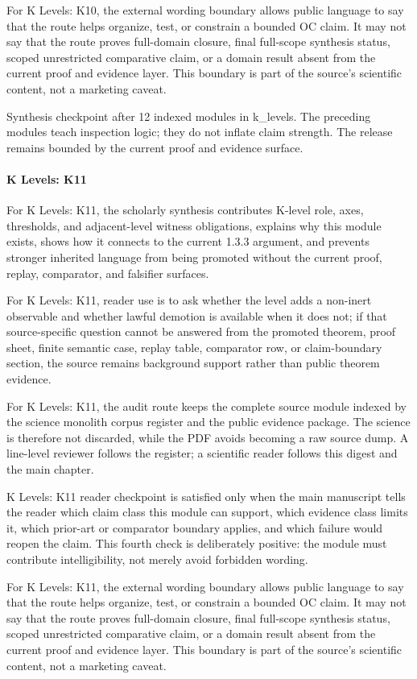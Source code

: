 For K Levels: K10, the external wording boundary allows public language to say that the route helps organize, test, or constrain a bounded OC claim. It may not say that the route proves full-domain closure, final full-scope synthesis status, scoped unrestricted comparative claim, or a domain result absent from the current proof and evidence layer. This boundary is part of the source's scientific content, not a marketing caveat.


Synthesis checkpoint after 12 indexed modules in k\_levels. The preceding modules teach inspection logic; they do not inflate claim strength. The release remains bounded by the current proof and evidence surface.


\paragraph{K Levels: K11}

For K Levels: K11, the scholarly synthesis contributes K-level role, axes, thresholds, and adjacent-level witness obligations, explains why this module exists, shows how it connects to the current 1.3.3 argument, and prevents stronger inherited language from being promoted without the current proof, replay, comparator, and falsifier surfaces.


For K Levels: K11, reader use is to ask whether the level adds a non-inert observable and whether lawful demotion is available when it does not; if that source-specific question cannot be answered from the promoted theorem, proof sheet, finite semantic case, replay table, comparator row, or claim-boundary section, the source remains background support rather than public theorem evidence.


For K Levels: K11, the audit route keeps the complete source module indexed by the science monolith corpus register and the public evidence package. The science is therefore not discarded, while the PDF avoids becoming a raw source dump. A line-level reviewer follows the register; a scientific reader follows this digest and the main chapter.


K Levels: K11 reader checkpoint is satisfied only when the main manuscript tells the reader which claim class this module can support, which evidence class limits it, which prior-art or comparator boundary applies, and which failure would reopen the claim. This fourth check is deliberately positive: the module must contribute intelligibility, not merely avoid forbidden wording.


For K Levels: K11, the external wording boundary allows public language to say that the route helps organize, test, or constrain a bounded OC claim. It may not say that the route proves full-domain closure, final full-scope synthesis status, scoped unrestricted comparative claim, or a domain result absent from the current proof and evidence layer. This boundary is part of the source's scientific content, not a marketing caveat.


